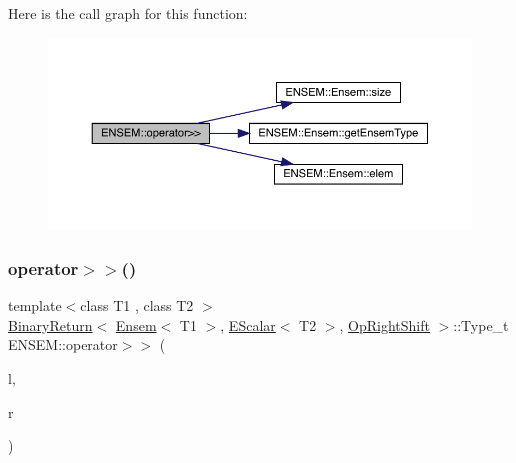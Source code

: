 Here is the call graph for this function\+:\nopagebreak
\begin{figure}[H]
\begin{center}
\leavevmode
\includegraphics[width=350pt]{d1/d9e/group__eensem_ga8b0f105a14d5692cffad3db6bae659fb_cgraph}
\end{center}
\end{figure}
\mbox{\label{group__eensem_ga1741fb098dc44e2f5fcd2bcabeafa0ed}} 
\subsubsection{\texorpdfstring{operator$>$$>$()}{operator>>()}\hspace{0.1cm}{\footnotesize\ttfamily [3/4]}}
{\footnotesize\ttfamily template$<$class T1 , class T2 $>$ \\
\mbox{\hyperlink{structENSEM_1_1BinaryReturn}{Binary\+Return}}$<$ \mbox{\hyperlink{classENSEM_1_1Ensem}{Ensem}}$<$ T1 $>$, \mbox{\hyperlink{classENSEM_1_1EScalar}{E\+Scalar}}$<$ T2 $>$, \mbox{\hyperlink{structENSEM_1_1OpRightShift}{Op\+Right\+Shift}} $>$\+::Type\+\_\+t E\+N\+S\+E\+M\+::operator$>$$>$ (\begin{DoxyParamCaption}\item[{const \mbox{\hyperlink{classENSEM_1_1Ensem}{Ensem}}$<$ T1 $>$ \&}]{l,  }\item[{const \mbox{\hyperlink{classENSEM_1_1EScalar}{E\+Scalar}}$<$ T2 $>$ \&}]{r }\end{DoxyParamCaption})\hspace{0.3cm}{\ttfamily [inline]}}

